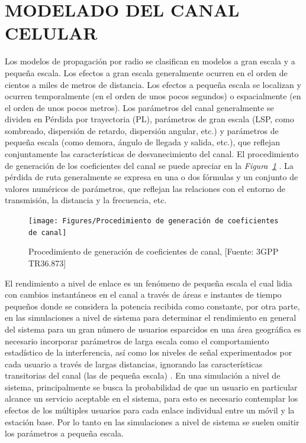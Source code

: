 
\section{MODELADO DEL CANAL CELULAR}

Los modelos de propagación por radio se clasifican en modelos a gran escala y a pequeña escala. Los efectos a gran escala generalmente ocurren en el orden de cientos a miles de metros de distancia. Los efectos a pequeña escala se localizan y ocurren temporalmente (en el orden de unos pocos segundos) o espacialmente (en el orden de unos pocos metros). Los parámetros del canal generalmente se dividen en Pérdida por trayectoria (PL), parámetros de gran escala (LSP, como sombreado, dispersión de retardo, dispersión angular, etc.) y parámetros de pequeña escala (como demora, ángulo de llegada y salida, etc.), que reflejan conjuntamente las características de desvanecimiento del canal. El procedimiento de generación de los coeficientes del canal se puede apreciar en la \textit{Figura~\ref{fig:Procedimiento de generacion de coeficientes de canal} }. La pérdida de ruta generalmente se expresa en una o dos fórmulas y un conjunto de valores numéricos de parámetros, que reflejan las relaciones con el entorno de transmisión, la distancia y la frecuencia, etc. \newline

\begin{figure}[th]
\centering
\texttt{[image: Figures/Procedimiento de generación de coeficientes de canal]}
\decoRule
\caption[Procedimiento de generación de coeficientes de canal]{Procedimiento de generación de coeficientes de canal, [Fuente: 3GPP TR36.873]}
\label{fig:Procedimiento de generacion de coeficientes de canal}
\end{figure}

El rendimiento a nivel de enlace es un fenómeno de pequeña escala el cual lidia con cambios instantáneos en el canal a través de áreas e instantes de tiempo pequeños donde se considera la potencia recibida como constante, por otra parte, en las simulaciones a nivel de sistema para determinar el rendimiento en general del sistema para un gran número de usuarios esparcidos en una área geográfica es necesario incorporar parámetros de larga escala como el comportamiento estadístico de la interferencia, así como los niveles de señal experimentados por cada usuario a través de largas distancias, ignorando las características transitorias del canal (las de pequeña escala) \parencite{Tranter2003}. En una simulación a nivel de sistema, principalmente se busca la probabilidad de que un usuario en particular alcance un servicio aceptable en el sistema, para esto es necesario contemplar los efectos de los múltiples usuarios para cada enlace individual entre un móvil y la estación base. Por lo tanto en las simulaciones a nivel de sistema se suelen omitir los parámetros a pequeña escala.\newline

